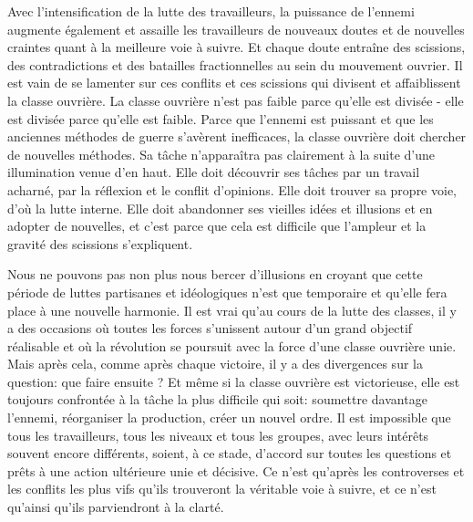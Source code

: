 Avec l'intensification de la lutte des travailleurs, la puissance de l'ennemi augmente également et assaille les travailleurs de nouveaux doutes et de nouvelles craintes quant à la meilleure voie à suivre. Et chaque doute entraîne des scissions, des contradictions et des batailles fractionnelles au sein du mouvement ouvrier. Il est vain de se lamenter sur ces conflits et ces scissions qui divisent et affaiblissent la classe ouvrière. La classe ouvrière n'est pas faible parce qu'elle est divisée - elle est divisée parce qu'elle est faible. Parce que l'ennemi est puissant et que les anciennes méthodes de guerre s'avèrent inefficaces, la classe ouvrière doit chercher de nouvelles méthodes. Sa tâche n'apparaîtra pas clairement à la suite d'une illumination venue d'en haut. Elle doit découvrir ses tâches par un travail acharné, par la réflexion et le conflit d'opinions. Elle doit trouver sa propre voie, d'où la lutte interne. Elle doit abandonner ses vieilles idées et illusions et en adopter de nouvelles, et c'est parce que cela est difficile que l'ampleur et la gravité des scissions s'expliquent.

Nous ne pouvons pas non plus nous bercer d'illusions en croyant que cette période de luttes partisanes et idéologiques n'est que temporaire et qu'elle fera place à une nouvelle harmonie. Il est vrai qu'au cours de la lutte des classes, il y a des occasions où toutes les forces s'unissent autour d'un grand objectif réalisable et où la révolution se poursuit avec la force d'une classe ouvrière unie. Mais après cela, comme après chaque victoire, il y a des divergences sur la question: que faire ensuite ? Et même si la classe ouvrière est victorieuse, elle est toujours confrontée à la tâche la plus difficile qui soit: soumettre davantage l'ennemi, réorganiser la production, créer un nouvel ordre. Il est impossible que tous les travailleurs, tous les niveaux et tous les groupes, avec leurs intérêts souvent encore différents, soient, à ce stade, d'accord sur toutes les questions et prêts à une action ultérieure unie et décisive. Ce n'est qu'après les controverses et les conflits les plus vifs qu'ils trouveront la véritable voie à suivre, et ce n'est qu'ainsi qu'ils parviendront à la clarté.

